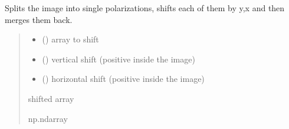 \documentclass[letterpaper,10pt,english]{sphinxmanual}
\begin{document}
\begin{fulllineitems}
\label{\detokenize{micropolarray.processing:micropolarray.processing.shift.shift}}
\pysigstartsignatures
{}
\pysigstopsignatures
\end{fulllineitems}


\begin{fulllineitems}
\label{\detokenize{micropolarray.processing:micropolarray.processing.shift.shift_micropol}}
\pysigstartsignatures
{}
\pysigstopsignatures
\sphinxAtStartPar
Splits the image into single polarizations, shifts each of them by y,x and then merges them back.
\begin{quote}\begin{description}
\begin{itemize}
\item {} 
\sphinxAtStartPar
{} () \textendash{} array to shift

\item {} 
\sphinxAtStartPar
{} () \textendash{} vertical shift (positive inside the image)

\item {} 
\sphinxAtStartPar
{} () \textendash{} horizontal shift (positive inside the image)

\end{itemize}

\sphinxAtStartPar
shifted array

\sphinxAtStartPar
np.ndarray

\end{description}\end{quote}

\end{fulllineitems}
\end{document}
